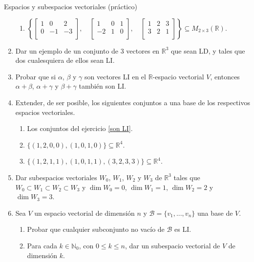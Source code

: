 \begin{chapter}{Espacios y subespacios vectoriales (práctico)}
\begin{enumerate}[resume, topsep=6pt, itemsep=.4cm]
\begin{enumerate}
    \item $\left\{  \begin{bmatrix} 1 & 0 & 2 \\ 0 & -1 & -3 \\ \end{bmatrix}, \quad
    \begin{bmatrix} 1 & 0 & 1 \\ -2 & 1 & 0 \\ \end{bmatrix}, \quad
    \begin{bmatrix} 1 & 2 & 3 \\ 3 & 2 & 1 \\ \end{bmatrix} \right\}\subseteq M_{2\times 3}(\mathbb{R})$.
\end{enumerate}


\item Dar un ejemplo de un conjunto de 3 vectores en $\mathbb{R}^3$ que sean LD, y tales que dos cualesquiera de ellos sean LI.


\item  Probar que si $\alpha$, $\beta$ y $\gamma$ son vectores LI en el $\mathbb{R}$-espacio vectorial $V$, entonces $\alpha +\beta$, $\alpha +\gamma$ y $\beta +\gamma $ también son LI.


\item Extender, de ser posible, los siguientes conjuntos a una base de los respectivos espacios vectoriales.

\begin{enumerate}
    \item Los conjuntos del ejercicio \ref{son LI}.
    \item\label{10b} $\{ (1,2,0,0),(1,0,1,0) \}\subseteq\mathbb{R}^4$.
    \item\label{10c} $\{ (1,2,1,1),(1,0,1,1),(3,2,3,3)\}\subseteq\mathbb{R}^4$.
\end{enumerate}


\item Dar subespacios vectoriales $W_0$, $W_1$, $W_2$ y $W_3$ de $\mathbb{R}^3$ tales que $W_0\subset W_1\subset W_2\subset W_3$ y $\dim W_0=0$, $\dim W_1=1$, $\dim W_2=2$ y $\dim W_3=3$.


\item Sea $V$ un espacio vectorial de dimensión $n$ y $\mathcal{B}=\{v_1, ..., v_n\}$ una base de $V$.
\begin{enumerate}
 \item Probar que cualquier subconjunto no vacío de $\mathcal{B}$ es LI.
 \item Para cada $k\in\mathbb{N}_0$,  con $0\leq k\leq n$, dar un subespacio vectorial de $V$ de dimensión $k$.
\end{enumerate}



\end{enumerate}
\end{chapter}
